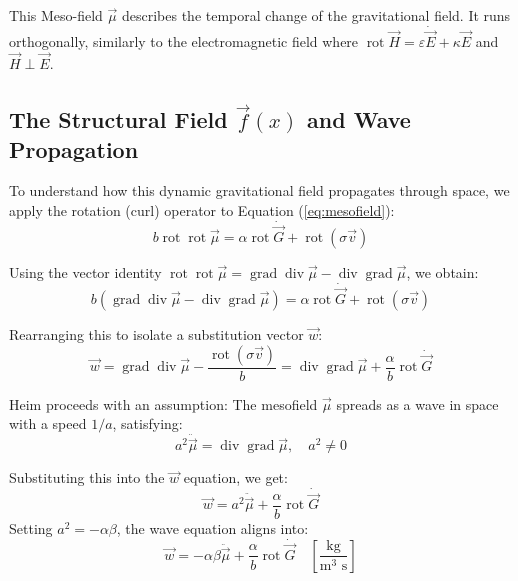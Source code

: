 \documentclass[11pt,a4paper,oneside]{article}
\begin{document}
This Meso-field $\vec{\mu}$ describes the temporal change of the gravitational field. It runs orthogonally, similarly to the electromagnetic field where $\operatorname{rot} \vec{H} = \varepsilon \dot{\vec{E}} + \kappa \vec{E}$ and $\vec{H} \perp \vec{E}$.

\subsection{The Structural Field \texorpdfstring{$\vec{f}(x)$}{f(x)} and Wave Propagation}

To understand how this dynamic gravitational field propagates through space, we apply the rotation (curl) operator to Equation (\ref{eq:mesofield}):
\begin{equation}
    b \operatorname{rot} \operatorname{rot} \vec{\mu} = \alpha \operatorname{rot} \dot{\vec{G}} + \operatorname{rot}(\sigma \vec{v})
\end{equation}

Using the vector identity $\operatorname{rot} \operatorname{rot} \vec{\mu} = \operatorname{grad} \operatorname{div} \vec{\mu} - \operatorname{div} \operatorname{grad} \vec{\mu}$, we obtain:
\begin{equation}
    b(\operatorname{grad} \operatorname{div} \vec{\mu} - \operatorname{div} \operatorname{grad} \vec{\mu}) = \alpha \operatorname{rot} \dot{\vec{G}} + \operatorname{rot}(\sigma \vec{v})
\end{equation}

Rearranging this to isolate a substitution vector $\vec{w}$:
\begin{equation}
    \vec{w} = \operatorname{grad} \operatorname{div} \vec{\mu} - \frac{\operatorname{rot}(\sigma \vec{v})}{b} = \operatorname{div} \operatorname{grad} \vec{\mu} + \frac{\alpha}{b} \operatorname{rot} \dot{\vec{G}}
\end{equation}

Heim proceeds with an assumption: The mesofield $\vec{\mu}$ spreads as a wave in space with a speed $1/a$, satisfying:
\begin{equation}
    a^2 \ddot{\vec{\mu}} = \operatorname{div} \operatorname{grad} \vec{\mu}, \quad a^2 \neq 0
\end{equation}

Substituting this into the $\vec{w}$ equation, we get:
\begin{equation}
    \vec{w} = a^2 \ddot{\vec{\mu}} + \frac{\alpha}{b} \operatorname{rot} \dot{\vec{G}}
\end{equation}
Setting $a^2 = -\alpha \beta$, the wave equation aligns into:
\begin{equation}
    \vec{w} = -\alpha \beta \ddot{\vec{\mu}} + \frac{\alpha}{b} \operatorname{rot} \dot{\vec{G}} \quad \left[ \frac{\text{kg}}{\text{m}^3 \text{ s}} \right]
\end{equation}
\end{document}
